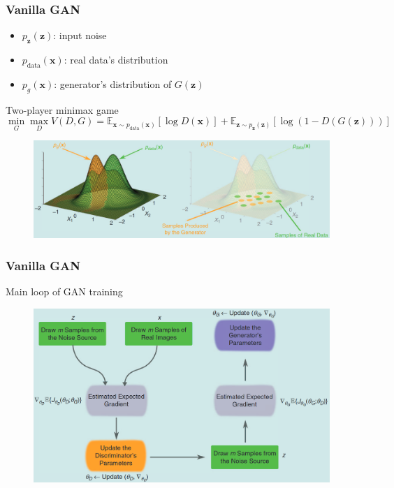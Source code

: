 \documentclass{beamer}
\begin{document}
\begin{frame}
\frametitle{Vanilla GAN}
\begin{itemize}
  \item $p_{\mathbf{z}}(\mathbf{z})$: input noise
  \item $p_{\text{data}}(\mathbf{x})$: real data's distribution
  \item $p_g(\mathbf{x})$: generator's distribution of $G(\mathbf{z})$
\end{itemize}
Two-player minimax game
$$\min_G \max_D V(D, G) = \mathbb{E}_{\mathbf{x} \sim p_{\text{data}}(\mathbf{x})}[\log D(\mathbf{x})] + \mathbb{E}_{\mathbf{z} \sim p_{\mathbf{z}}(\mathbf{z})}[\log (1-D(G(\mathbf{z})))]$$
\begin{figure}
  \includegraphics[height=.4\textheight]{GAN_distribution.png}
\end{figure}
\end{frame}

\begin{frame}
\frametitle{Vanilla GAN}
Main loop of GAN training
\begin{figure}
  \includegraphics[height=.7\textheight]{GAN_training.png}
\end{figure}
\end{frame}
\end{document}
